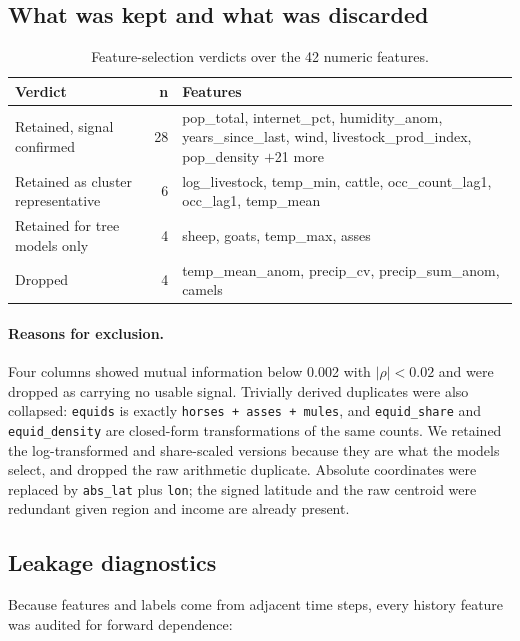 \documentclass[11pt]{article}
\begin{document}
\subsection{What was kept and what was discarded}

\begin{table}[H]
\centering
\caption{Feature-selection verdicts over the 42 numeric features.}
\label{tab:keepdrop}
\small
\begin{tabular}{@{}p{4.6cm}rp{9.2cm}@{}}
\toprule
\textbf{Verdict} & \textbf{n} & \textbf{Features} \\
\midrule
Retained, signal confirmed & 28 & pop\_total, internet\_pct, humidity\_anom, years\_since\_last, wind, livestock\_prod\_index, pop\_density $+$21 more \\
Retained as cluster representative & 6 & log\_livestock, temp\_min, cattle, occ\_count\_lag1, occ\_lag1, temp\_mean \\
Retained for tree models only & 4 & sheep, goats, temp\_max, asses \\
Dropped & 4 & temp\_mean\_anom, precip\_cv, precip\_sum\_anom, camels \\
\bottomrule
\end{tabular}
\end{table}

\paragraph{Reasons for exclusion.} Four columns showed mutual information below 0.002 with
$|\rho| < 0.02$ and were dropped as carrying no usable signal. Trivially derived duplicates were
also collapsed: \texttt{equids} is exactly \texttt{horses + asses + mules}, and
\texttt{equid\_share} and \texttt{equid\_density} are closed-form transformations of the same
counts. We retained the log-transformed and share-scaled versions because they are what the models
select, and dropped the raw arithmetic duplicate. Absolute coordinates were replaced by
\texttt{abs\_lat} plus \texttt{lon}; the signed latitude and the raw centroid were redundant
given region and income are already present.

\subsection{Leakage diagnostics}

Because features and labels come from adjacent time steps, every history feature was audited for
forward dependence:
\end{document}
